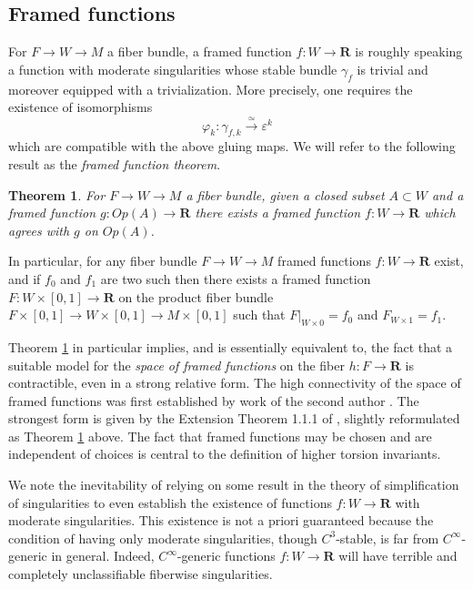 \documentclass{amsart}
\newcommand{\ve}{\varepsilon}
\def\bR{\mathbf{R}}
\newtheorem{theorem}{Theorem}[section]
\theoremstyle{definition}
\theoremstyle{remark}
\newtheorem{inductive lemma}[theorem]{Inductive Lemma}
\begin{document}
\subsection{Framed functions}

For $F \to W \to M$ a fiber bundle, a framed function $f:W \to \bR$ is roughly speaking a function with moderate singularities whose stable bundle $\gamma_f$ is trivial and moreover equipped with a trivialization. More precisely, one requires the existence of isomorphisms $$\varphi_k: \gamma_{f,k} \xrightarrow{\simeq} \ve^k$$ which are compatible with the above gluing maps. We will refer to the following result as the {\em framed function theorem}.

\begin{theorem}\label{thm: framed function}
For $F \to W \to M$ a fiber bundle, given a closed subset $A \subset W$ and a framed function $g:Op(A) \to \bR$ there exists a framed function $f:W \to \bR$ which agrees with $g$ on $Op(A)$. 
\end{theorem}

In particular, for any fiber bundle $F \to W \to M$ framed functions $f:W \to \bR$ exist, and if $f_0$ and $f_1$ are two such then there exists a framed function $F:W \times [0,1] \to \bR$ on the product fiber bundle $F \times [0,1] \to W \times [0,1] \to M \times [0,1]$ such that $F|_{W \times 0} = f_0$ and $F_{W \times 1} = f_1$. 

Theorem \ref{thm: framed function}  in particular implies, and is essentially equivalent to, the fact that a suitable model for the {\em space of framed functions} on the fiber $h:F \to \bR$ is contractible, even in a strong relative form. The high connectivity of the space of framed functions was first established by work of the second author \cite{I87}. The strongest form is given by the Extension Theorem 1.1.1 of \cite{EM12}, slightly reformulated as Theorem \ref{thm: framed function} above. The fact that framed functions may be chosen and are independent of choices is central to the definition of higher torsion invariants. 

We note the inevitability of relying on some result in the theory of simplification of singularities to even establish the existence of functions $f:W \to \bR$ with moderate singularities. This existence is not a priori guaranteed because the condition of having only moderate singularities, though $C^3$-stable, is far from $C^\infty$-generic in general. Indeed, $C^\infty$-generic functions $f:W \to \bR$ will have terrible and completely unclassifiable fiberwise singularities.
\end{document}
